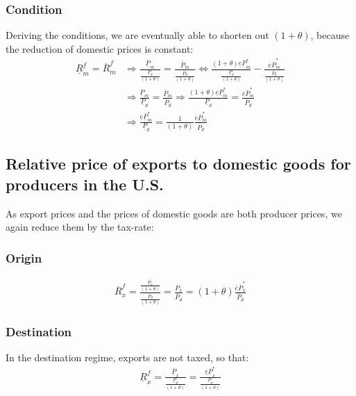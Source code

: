  
\subsubsection*{Condition}
Deriving the conditions, we are eventually able to shorten out $(1+\theta)$, because the reduction of domestic prices is constant: 
\begin{equation}\label{mpro.con}
\begin{aligned}
    \underline R^f_m = \overline R^f_m &\Rightarrow \frac{\underline P_m}{\frac{\underline P_d}{ \left( 1+\theta \right) }} = \frac{\overline P_m}{\frac{\overline P_d}{ \left( 1+\theta \right) }} \Leftrightarrow \frac{ \left( 1+\theta \right) \underline e \underline P^*_m}{\frac{\underline P_d}{ \left( 1+\theta \right) }} - \frac{\overline e \overline P^*_m}{\frac{\overline P_d}{ \left( 1+\theta \right) }} \\ &\Rightarrow \frac{\underline P_m}{\underline P_d} = \frac{\overline P_m}{\overline P_d} \Rightarrow \frac{ \left( 1+\theta \right) \underline e \underline P^*_m}{{\underline P_d}} = \frac{\overline e \overline P^*_m}{\overline P_d}  \\ &\Rightarrow \frac{\underline e \underline P^*_m}{{\underline P_d}} = \frac{1}{ \left( 1+\theta \right) } \frac{\overline e \overline P^*_m}{\overline P_d}
\end{aligned} 
\end{equation}


\subsection*{Relative price of exports to domestic goods for producers in the U.S.}
As export prices and the prices of domestic goods are both producer prices, we again reduce them by the tax-rate: 
\subsubsection*{Origin}
\begin{equation}\label{xpro.o}
\begin{aligned}
\overline R^f_x = \frac{\frac{\overline P_x}{ \left( 1+\theta \right) }}{\frac{\overline P_d}{ \left( 1+\theta \right) }} = \frac{\overline P_x}{\overline P_d} =  \left( 1+\theta \right) \frac{\overline e \overline P^*_x}{\overline P_d}
\end{aligned} 
\end{equation}

\subsubsection*{Destination}
In the destination regime, exports are not taxed, so that:
\begin{equation}\label{xpro.d}
\begin{aligned}
\underline R^f_x = \frac{\underline P_x}{\frac{\underline P_d}{ \left( 1+\theta \right) }} = \frac{\underline e \underline P^*_x}{\frac{\underline P_d}{ \left( 1+\theta \right) }}
\end{aligned} 
\end{equation}

